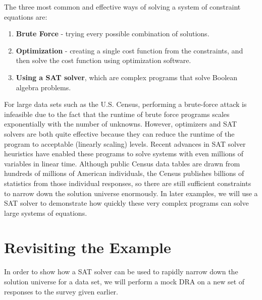 \documentclass[jou,apacite]{apa6}
\begin{document}
The three most common and effective ways of solving a
system of constraint equations are:
\begin{enumerate}

\item \textbf{Brute Force} - trying every possible combination of solutions.\\
\item \textbf{Optimization} - creating a single cost function from the constraints, and then solve the cost function using optimization software. \\
\item \textbf{Using a SAT solver}, which are complex programs that solve Boolean algebra problems.

\end{enumerate}

For large data sets such as the U.S. Census, performing a brute-force attack is infeasible due to the fact that the runtime of brute force programs scales exponentially with the number of unknowns. However, optimizers and SAT solvers are both quite effective because they can reduce the runtime of the program to acceptable (linearly scaling) levels. Recent advances in SAT solver heuristics have enabled these programs to solve systems with even millions of variables in linear time. Although public Census data tables are drawn from hundreds of millions of American individuals, the Census publishes billions of statistics from those individual responses, so there are still sufficient constraints to narrow down the solution universe enormously. In later examples, we will use a SAT solver to demonstrate how quickly these very complex programs can solve large systems of equations.

\section{Revisiting the Example}

In order to show how a SAT solver can be used to rapidly narrow down the solution universe for a data set, we will perform a mock DRA on a new set of responses to the survey given earlier.
\end{document}
